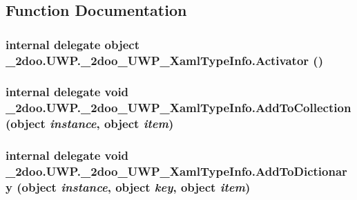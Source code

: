 \subsection{Function Documentation}
\hypertarget{namespace__2doo_1_1_u_w_p_1_1__2doo___u_w_p___xaml_type_info_c5626aea14ab42405d639dc93ce0fbf4}{
\subsubsection[{Activator}]{\setlength{\rightskip}{0pt plus 5cm}internal delegate object \_\-2doo.UWP.\_\-2doo\_\-UWP\_\-XamlTypeInfo.Activator ()}}
\label{namespace__2doo_1_1_u_w_p_1_1__2doo___u_w_p___xaml_type_info_c5626aea14ab42405d639dc93ce0fbf4}


\hypertarget{namespace__2doo_1_1_u_w_p_1_1__2doo___u_w_p___xaml_type_info_43e48f43ea3d96376289a09f05c3116b}{
\subsubsection[{AddToCollection}]{\setlength{\rightskip}{0pt plus 5cm}internal delegate void \_\-2doo.UWP.\_\-2doo\_\-UWP\_\-XamlTypeInfo.AddToCollection (object {\em instance}, \/  object {\em item})}}
\label{namespace__2doo_1_1_u_w_p_1_1__2doo___u_w_p___xaml_type_info_43e48f43ea3d96376289a09f05c3116b}


\hypertarget{namespace__2doo_1_1_u_w_p_1_1__2doo___u_w_p___xaml_type_info_b2f5b65cf492f4dd16ae42c7a87edcd5}{
\subsubsection[{AddToDictionary}]{\setlength{\rightskip}{0pt plus 5cm}internal delegate void \_\-2doo.UWP.\_\-2doo\_\-UWP\_\-XamlTypeInfo.AddToDictionary (object {\em instance}, \/  object {\em key}, \/  object {\em item})}}
\label{namespace__2doo_1_1_u_w_p_1_1__2doo___u_w_p___xaml_type_info_b2f5b65cf492f4dd16ae42c7a87edcd5}


